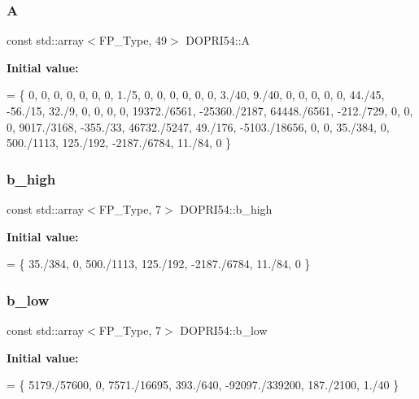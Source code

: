 \subsubsection{\texorpdfstring{A}{A}}
{\footnotesize\ttfamily const std\+::array$<$F\+P\+\_\+\+Type, 49$>$ D\+O\+P\+R\+I54\+::A}

{\bfseries Initial value\+:}
\begin{DoxyCode}
= \{
    0,            0,             0,            0,          0,             0,       0,
    1./5,         0,             0,            0,          0,             0,       0,
    3./40,        9./40,         0,            0,          0,             0,       0,
    44./45,       -56./15,       32./9,        0,          0,             0,       0,
    19372./6561,  -25360./2187,  64448./6561,  -212./729,  0,             0,       0,
    9017./3168,   -355./33,      46732./5247,  49./176,    -5103./18656,  0,       0,
    35./384,      0,             500./1113,    125./192,   -2187./6784,   11./84,  0
  \}
\end{DoxyCode}
\mbox{\label{structDOPRI54_a0f82be4621ccdb66b90c921f1574b946}} 
\subsubsection{\texorpdfstring{b\+\_\+high}{b\_high}}
{\footnotesize\ttfamily const std\+::array$<$F\+P\+\_\+\+Type, 7$>$ D\+O\+P\+R\+I54\+::b\+\_\+high}

{\bfseries Initial value\+:}
\begin{DoxyCode}
= \{
    35./384, 0, 500./1113, 125./192, -2187./6784, 11./84, 0
  \}
\end{DoxyCode}
\mbox{\label{structDOPRI54_a5b2e88487f09bc254164b76669a9d31d}} 
\subsubsection{\texorpdfstring{b\+\_\+low}{b\_low}}
{\footnotesize\ttfamily const std\+::array$<$F\+P\+\_\+\+Type, 7$>$ D\+O\+P\+R\+I54\+::b\+\_\+low}

{\bfseries Initial value\+:}
\begin{DoxyCode}
= \{
    5179./57600, 0, 7571./16695, 393./640, -92097./339200, 187./2100, 1./40
  \}
\end{DoxyCode}
\mbox{\label{structDOPRI54_addfbe4836405ac9e827d2da960d9b589}} 

